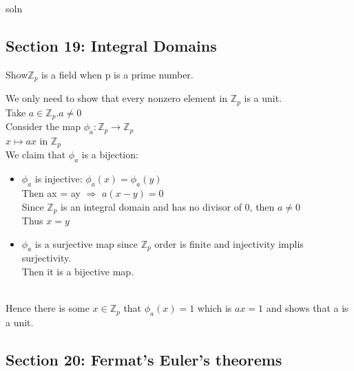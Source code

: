 \documentclass{article}
\newcommand\Z{\ensuremath{\mathbb{Z}}}
\begin{document}
\begin{Solution}
    soln
\end{Solution}
\newpage

\subsection{Section 19: Integral Domains}

\begin{Example}
    Show$ \Z_p$ is a field when p is a prime number. 
\end{Example}
\begin{Proof}
    We only need to show that every nonzero element in $\Z_p$ is a unit.
    \\Take $a \in \Z_p. a\neq 0$ 
    \\Consider the map $\phi_a : \Z_p \rightarrow \Z_p $
    \\ \hspace*{3.5cm} $x \mapsto ax$ in $\Z_p$
    \\ We claim that $\phi_a $ is a bijection:
    \begin{itemize}
        \item $\phi_a$ is injective: $\phi_a(x) = \phi_a(y)$
        \\Then ax = ay $\Rightarrow$ $a(x-y) = 0$
        \\ Since $\Z_p$ is an integral domain and has no divisor of 0, then $a\neq0$
        \\ Thus $x = y$
    \end{itemize}
    \begin{itemize}
        \item $\phi_a$ is a surjective map since $\Z_p$ order is finite and injectivity implis surjectivity. \\ Then it is a bijective map.
    \end{itemize}
    \\Hence there is some $x\in \Z_p$ that $\phi_a(x) = 1$ which is $ax = 1$ and shows that a is a unit. 
\end{Proof}

\newpage

\subsection{Section 20: Fermat's Euler's theorems}
\end{document}
